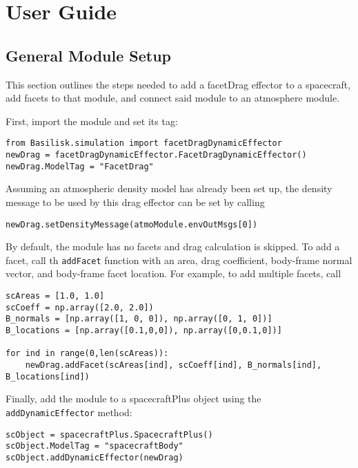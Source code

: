 
\section{User Guide}

\subsection{General Module Setup}
This section outlines the steps needed to add a facetDrag effector to a spacecraft, add facets to that module, and connect said module to an atmosphere module.

First, import the module and set its tag:
\begin{verbatim}
from Basilisk.simulation import facetDragDynamicEffector
newDrag = facetDragDynamicEffector.FacetDragDynamicEffector()
newDrag.ModelTag = "FacetDrag"
\end{verbatim}

Assuming an atmospheric density model has already been set up, the density message to be used by this drag effector can be set by calling
\begin{verbatim}
newDrag.setDensityMessage(atmoModule.envOutMsgs[0])
\end{verbatim}

By default, the module has no facets and drag calculation is skipped. To add a facet, call th \verb|addFacet| function with an area, drag coefficient, body-frame normal vector, and body-frame facet location. For example, to add multiple facets, call
\begin{verbatim}
scAreas = [1.0, 1.0]
scCoeff = np.array([2.0, 2.0])
B_normals = [np.array([1, 0, 0]), np.array([0, 1, 0])]
B_locations = [np.array([0.1,0,0]), np.array([0,0.1,0])]

for ind in range(0,len(scAreas)):
	newDrag.addFacet(scAreas[ind], scCoeff[ind], B_normals[ind], B_locations[ind])
\end{verbatim}


Finally, add the module to a spacecraftPlus object using the \verb|addDynamicEffector| method:
\begin{verbatim}
scObject = spacecraftPlus.SpacecraftPlus()
scObject.ModelTag = "spacecraftBody"
scObject.addDynamicEffector(newDrag)
\end{verbatim}

